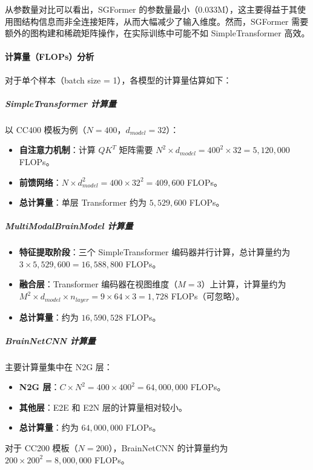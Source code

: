 \documentclass[12pt,a4paper]{article}
\begin{document}
从参数量对比可以看出，SGFormer 的参数量最小（0.033M），这主要得益于其使用图结构信息而非全连接矩阵，从而大幅减少了输入维度。然而，SGFormer 需要额外的图构建和稀疏矩阵操作，在实际训练中可能不如 SimpleTransformer 高效。

\paragraph{计算量（FLOPs）分析}

对于单个样本（batch size = 1），各模型的计算量估算如下：

\subparagraph{SimpleTransformer 计算量}

以 CC400 模板为例（$N=400$，$d_{model}=32$）：
\begin{itemize}
\item \textbf{自注意力机制}：计算 $QK^T$ 矩阵需要 $N^2 \times d_{model} = 400^2 \times 32 = 5,120,000$ FLOPs。
\item \textbf{前馈网络}：$N \times d_{model}^2 = 400 \times 32^2 = 409,600$ FLOPs。
\item \textbf{总计算量}：单层 Transformer 约为 $5,529,600$ FLOPs。
\end{itemize}

\subparagraph{MultiModalBrainModel 计算量}

\begin{itemize}
\item \textbf{特征提取阶段}：三个 SimpleTransformer 编码器并行计算，总计算量约为 $3 \times 5,529,600 = 16,588,800$ FLOPs。
\item \textbf{融合层}：Transformer 编码器在视图维度（$M=3$）上计算，计算量约为 $M^2 \times d_{model} \times n_{layer} = 9 \times 64 \times 3 = 1,728$ FLOPs（可忽略）。
\item \textbf{总计算量}：约为 $16,590,528$ FLOPs。
\end{itemize}

\subparagraph{BrainNetCNN 计算量}

主要计算量集中在 N2G 层：
\begin{itemize}
\item \textbf{N2G 层}：$C \times N^2 = 400 \times 400^2 = 64,000,000$ FLOPs。
\item \textbf{其他层}：E2E 和 E2N 层的计算量相对较小。
\item \textbf{总计算量}：约为 $64,000,000$ FLOPs。
\end{itemize}

对于 CC200 模板（$N=200$），BrainNetCNN 的计算量约为 $200 \times 200^2 = 8,000,000$ FLOPs。
\end{document}
